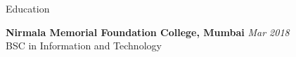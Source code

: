 \documentclass{resume} %
\begin{document}

\begin{rSection}{Education}

{\bf Nirmala Memorial Foundation College, Mumbai} \hfill {\em Mar 2018} 
\\ BSC in Information and Technology



\end{rSection}
\end{document}
